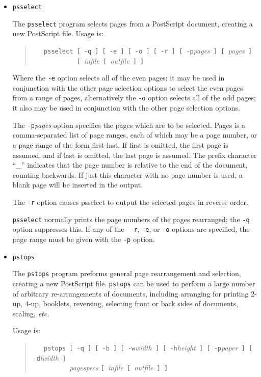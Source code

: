 \documentclass[twoside,11pt]{article}
\begin{document}
\begin{itemize}
\item {\tt psselect}

The {\tt psselect} program selects pages from a PostScript document,
creating a new PostScript file. Usage is: 

\begin{quote}
\verb+   psselect [ -q ] [ -e ] [ -o ] [ -r ] [ -p+{\em pages}\verb+ ] [ +{\em pages}\verb+ ]+\\
\verb+            [ +{\em infile}\verb+ [ +{\em outfile}\verb+ ] ]+
\end{quote}

Where the {\tt -e} option selects all of the even pages; it may be
used in conjunction with the other page selection options to select
the even pages from a range of pages, alternatively the {\tt -o}
option selects all of the odd pages; it also may be used in
conjunction with the other page selection options.
 
The {\tt -p}{\em pages} option specifies the pages which are to be
selected. Pages is a comma-separated list of page ranges, each of
which may be a page number, or a page range of the form first-last. If
first is omitted, the first page is assumed, and if last is omitted,
the last page is assumed. The prefix character ``\_'' indicates that
the page number is relative to the end of the document, counting
backwards. If just this character with no page number is used, a blank
page will be inserted in the output. 

The {\tt -r} option causes psselect to output the selected pages in reverse order. 

{\tt psselect} normally prints the page numbers of the pages
rearranged; the {\tt -q} option suppresses this.  If any of the {\tt
-r}, {\tt -e}, or {\tt -o} options are specified, the page range must
be given with the {\tt -p} option. 

\item {\tt pstops}

The {\tt pstops} program preforms general page rearrangement and
selection, creating a new PostScript file. {\tt pstops} can be used to
perform a large number of arbitrary re-arrangements of documents,
including arranging for printing 2-up, 4-up, booklets, reversing,
selecting front or back sides of documents, scaling, {\em etc.\ }

Usage is:

\begin{quote}
\verb+   pstops [ -q ] [ -b ] [ -w+{\em width}\verb+ ] [ -h+{\em height}\verb+ ] [ -p+{\em paper}\verb+ ] [ -d+{\em lwidth}\verb+ ] +\\
\verb+          +{\em pagespecs} \verb+[ +{\em infile}\verb+ [ +{\em outfile}\verb+ ] ]+
\end{quote}


\end{itemize}
\end{document}
